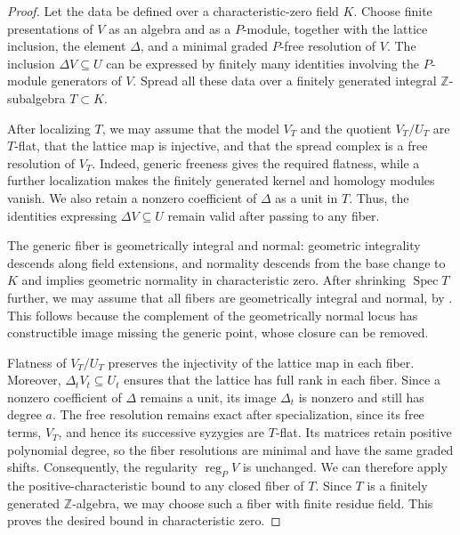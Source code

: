 \documentclass[12pt]{amsart}
\numberwithin{equation}{section}
\theoremstyle{definition}
\theoremstyle{remark}
\numberwithin{equation}{section}
\DeclareMathOperator{\reg}{reg}
\begin{document}
\begin{proof}
Let the data be defined over a characteristic-zero field $K$. Choose finite presentations of $V$ as an algebra and as a $P$-module, together with the lattice inclusion, the element $\Delta$, and a minimal graded $P$-free resolution of $V$. The inclusion $\Delta V\subseteq U$ can be expressed
by finitely many identities involving the $P$-module generators of $V$. Spread all these data over a finitely generated integral $\mathbb Z$-subalgebra $T\subset K$.

After localizing $T$, we may assume that the model $V_T$ and the quotient $V_T/U_T$ are $T$-flat, that the lattice map is injective, and that the spread complex is a free resolution of $V_T$. Indeed, generic freeness gives the required flatness, while a further localization makes the finitely generated kernel and homology modules vanish. We also retain a nonzero coefficient of $\Delta$ as a unit in $T$. Thus, the identities expressing $\Delta V\subseteq U$ remain valid after passing to any fiber.

The generic fiber is geometrically integral and normal:  geometric integrality descends along field extensions, and normality descends from the base change to $K$ and implies geometric normality in characteristic zero.
After shrinking $\operatorname{Spec}T$ further, we may assume that all fibers are geometrically integral and normal,
by \cite[9.7.7(iv) and 12.1.6(iv)]{EGA3}. This follows because the complement of the geometrically normal locus has constructible image missing the generic point, whose closure can be removed.

Flatness of $V_T/U_T$ preserves the injectivity of the lattice map in each fiber. Moreover, $\Delta_tV_t\subseteq U_t$ ensures that
the lattice has full rank in each fiber. Since a nonzero coefficient of $\Delta$ remains a unit, its image $\Delta_t$ is nonzero and still has degree $a$.
The free resolution remains exact after specialization, since its free terms, $V_T$, and hence its successive syzygies
are $T$-flat. Its matrices retain positive polynomial degree, so the fiber resolutions are minimal and have the same graded shifts.
Consequently, the regularity $\reg_PV$ is unchanged. We can therefore apply the positive-characteristic
bound to any closed fiber of $T$. Since $T$ is a finitely generated $\mathbb Z$-algebra, we may choose such a fiber with finite
residue field. This proves the desired bound in characteristic zero.
\end{proof}
\end{document}
